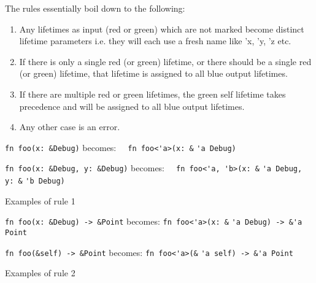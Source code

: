 The rules essentially boil down to the following:
\begin{enumerate}
\item Any lifetimes as input (red or green) which are not marked become distinct lifetime parameters i.e. they will each use a fresh name like 'x, 'y, 'z etc.
\item If there is only a single red (or green) lifetime, or there should be a single red (or green) lifetime, that lifetime is assigned to all blue output lifetimes.
\item If there are multiple red or green lifetimes, the green self lifetime takes precedence and will be assigned to all blue output lifetimes.
\item Any other case is an error.
\end{enumerate}

\begin{fig}
{\verb|fn foo(x: &Debug)|}\newline
becomes: {\verb|  fn foo<'a>(x: &|}
{\color{red} \verb|'a|}{\verb| Debug)|}

\vspace{4mm}

{\verb|fn foo(x: &Debug, y: &Debug)|}\newline
becomes: {\verb|  fn foo<'a, 'b>(x: &|}
{\color{red} \verb|'a|}{\verb| Debug, y: &|}{\color{red} \verb|'b|}{\verb| Debug)|}

\caption{Examples of rule 1}
\label{Fig:lifetimes2}
\end{fig}

\begin{fig}
{\verb|fn foo(x: &Debug) -> &Point|}\newline
becomes: {\verb|fn foo<'a>(x: &|}
{\color{red} \verb|'a|}{\verb| Debug) -> &|}{\color{blue}\verb|'a|}{\verb| Point|}

\vspace{4mm}

{\verb|fn foo(&self) -> &Point|}\newline
becomes: {\verb|fn foo<'a>(&|}
{\color{green} \verb|'a|}{\verb| self) -> &|}{\color{blue}\verb|'a|}{\verb| Point|}

\caption{Examples of rule 2}
\label{Fig:lifetimes3}
\end{fig}

